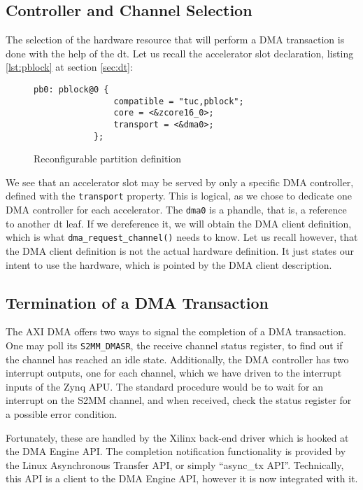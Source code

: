 \subsection{Controller and Channel Selection}

The selection of the hardware resource that will perform a DMA transaction is done
with the help of the \gls{dt}. Let us recall the accelerator slot declaration,
listing \ref{lst:pblock} at section \ref{sec:dt}:

\begin{figure}[H]
\centering
\begin{lstlisting}[style=basic]
		pb0: pblock@0 {
				compatible = "tuc,pblock";
				core = <&zcore16_0>;
				transport = <&dma0>;
			};
\end{lstlisting}
\caption{Reconfigurable partition definition}
\label{lst:pblock-2}
\end{figure}

We see that an accelerator slot may be served by only a specific DMA controller,
defined with the \texttt{transport} property.
This is logical, as we chose to dedicate one DMA controller for each accelerator.
The \texttt{dma0} is a phandle, that is, a reference to another \gls{dt} leaf.
If we dereference it, we will obtain the DMA client definition, which is what
\texttt{dma\_request\_channel()} needs to know. Let us recall however,
that the DMA client definition is not the actual hardware definition.
It just states our intent to use the hardware, which is pointed by the DMA client
description.


\subsection{Termination of a DMA Transaction}

The AXI DMA offers two ways to signal the completion of a DMA transaction. 
One may poll its \texttt{S2MM\_DMASR}, the receive channel status register,
to find out if the channel has reached an idle state. Additionally,
the DMA controller has two interrupt outputs, one for each channel,
which we have driven to the interrupt inputs of the Zynq APU. 
The standard procedure would be to wait for an interrupt on the S2MM channel,
and when received, check the status register for a possible error condition.

Fortunately, these are handled by the Xilinx back-end driver which is hooked
at the DMA Engine API. The completion notification functionality
is provided by the Linux Asynchronous Transfer API, or simply ``async\_tx API''. 
Technically, this API is a client to the DMA Engine API, 
however it is now integrated with it.


